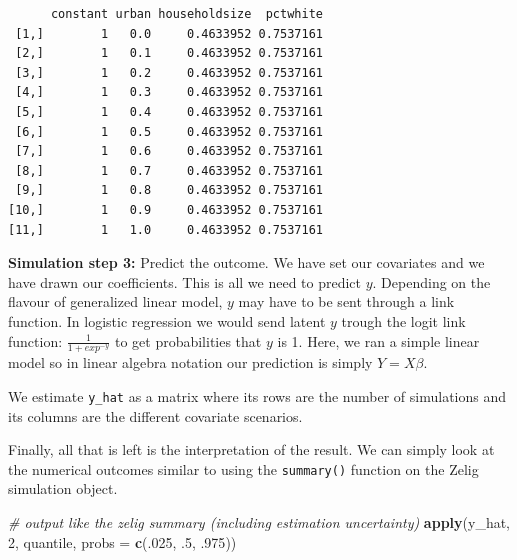 \documentclass[]{article}
\newenvironment{Shaded}{\begin{snugshade}}{\end{snugshade}}
\newcommand{\CommentTok}[1]{\textcolor[rgb]{0.56,0.35,0.01}{\textit{#1}}}
\newcommand{\DataTypeTok}[1]{\textcolor[rgb]{0.13,0.29,0.53}{#1}}
\newcommand{\DecValTok}[1]{\textcolor[rgb]{0.00,0.00,0.81}{#1}}
\newcommand{\FloatTok}[1]{\textcolor[rgb]{0.00,0.00,0.81}{#1}}
\newcommand{\KeywordTok}[1]{\textcolor[rgb]{0.13,0.29,0.53}{\textbf{#1}}}
\newcommand{\NormalTok}[1]{#1}
\newcommand{\OperatorTok}[1]{\textcolor[rgb]{0.81,0.36,0.00}{\textbf{#1}}}
\newcommand{\StringTok}[1]{\textcolor[rgb]{0.31,0.60,0.02}{#1}}
\begin{document}
\begin{verbatim}
      constant urban householdsize  pctwhite
 [1,]        1   0.0     0.4633952 0.7537161
 [2,]        1   0.1     0.4633952 0.7537161
 [3,]        1   0.2     0.4633952 0.7537161
 [4,]        1   0.3     0.4633952 0.7537161
 [5,]        1   0.4     0.4633952 0.7537161
 [6,]        1   0.5     0.4633952 0.7537161
 [7,]        1   0.6     0.4633952 0.7537161
 [8,]        1   0.7     0.4633952 0.7537161
 [9,]        1   0.8     0.4633952 0.7537161
[10,]        1   0.9     0.4633952 0.7537161
[11,]        1   1.0     0.4633952 0.7537161
\end{verbatim}

\textbf{Simulation step 3:} Predict the outcome. We have set our covariates and we have drawn our coefficients. This is all we need to predict \(y\). Depending on the flavour of generalized linear model, \(y\) may have to be sent through a link function. In logistic regression we would send latent \(y\) trough the logit link function: \(\frac{1}{1 + exp^{-y}}\) to get probabilities that \(y\) is 1. Here, we ran a simple linear model so in linear algebra notation our prediction is simply \(Y=X\beta\).

We estimate \texttt{y\_hat} as a matrix where its rows are the number of simulations and its columns are the different covariate scenarios.

\begin{Shaded}
\end{Shaded}

Finally, all that is left is the interpretation of the result. We can simply look at the numerical outcomes similar to using the \texttt{summary()} function on the Zelig simulation object.

\begin{Shaded}
\begin{Highlighting}[]
\CommentTok{# output like the zelig summary (including estimation uncertainty)}
\KeywordTok{apply}\NormalTok{(y_hat, }\DecValTok{2}\NormalTok{, quantile, }\DataTypeTok{probs =} \KeywordTok{c}\NormalTok{(.}\DecValTok{025}\NormalTok{, }\FloatTok{.5}\NormalTok{, }\FloatTok{.975}\NormalTok{))}
\end{Highlighting}
\end{Shaded}
\end{document}
